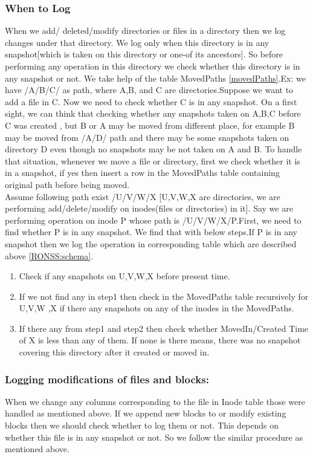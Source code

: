 \subsubsection{When to Log}
 When we add/ deleted/modify directories or files in a directory then we log changes under that directory. We log only when this directory is in any snapshot[which is taken on this directory or one-of its ancestors]. So before performing any operation in this directory we check whether this directory is in any snapshot or not. We take help of the table MovedPaths \ref{movedPaths}.Ex: we have /A/B/C/ as path, where A,B, and C are directories.Suppose we want to add a file in C. Now we need to check whether C is in any snapshot. On a first sight, we can think that checking whether any snapshots taken on A,B,C before C was created , but B or A may be moved from different place, for example B may be moved from /A/D/ path and there may be some snapshots taken on directory D even though no snapshots may be not taken on A and B. To handle that situation, whenever we move a file or directory, first we check whether it is in a snapshot, if yes then insert a row in the MovedPaths table containing original path before being moved. \\
 Assume following path exist /U/V/W/X [U,V,W,X are directories, we are performing add/delete/modify on inodes(files or directories) in it]. Say we are performing operation on inode P whose path is /U/V/W/X/P.First, we need to find whether P is in any snapshot. We find that with below steps.If P is in any snapshot then we log the operation in corresponding table which are described above \ref{RONSS:schema}. 
 \begin{enumerate}
 \item  Check if any snapshots on U,V,W,X before present time.
\item  If we not find any in step1 then check in the MovedPaths table recursively for U,V,W ,X if there any snapshots on any of the inodes in the MovedPaths.
\item If there any from step1 and step2 then check whether MovedIn/Created Time of X is less than any of them. If none is there means, there was no snapshot covering this directory after it created or moved in.
\end{enumerate}  

\subsubsection{Logging modifications of files and blocks:}
When we change any columns corresponding to the file in Inode table those were handled as mentioned above. If we append new blocks to or modify existing blocks then we should check whether to log them or not. This depends on whether this file is in any snapshot or not. So we follow the similar procedure as mentioned above.

